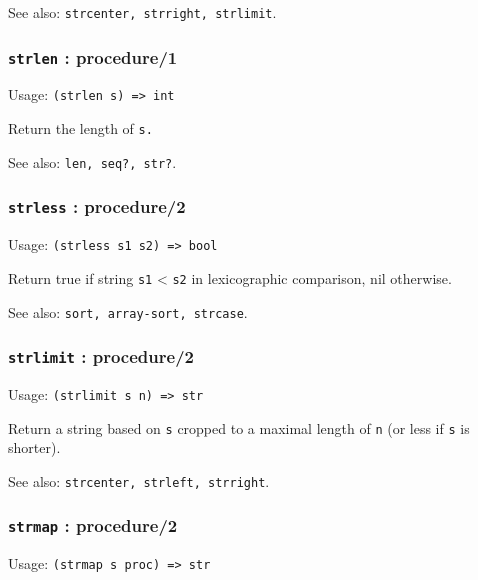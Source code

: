 \documentclass[
]{article}
\newcommand{\passthrough}[1]{#1}
\begin{document}
See also: \passthrough{\lstinline!strcenter, strright, strlimit!}.

\hypertarget{strlen-procedure1}{%
\subsubsection{\texorpdfstring{\texttt{strlen} :
procedure/1}{strlen : procedure/1}}\label{strlen-procedure1}}

Usage: \passthrough{\lstinline!(strlen s) => int!}

Return the length of \passthrough{\lstinline!s.!}

See also: \passthrough{\lstinline!len, seq?, str?!}.

\hypertarget{strless-procedure2}{%
\subsubsection{\texorpdfstring{\texttt{strless} :
procedure/2}{strless : procedure/2}}\label{strless-procedure2}}

Usage: \passthrough{\lstinline!(strless s1 s2) => bool!}

Return true if string \passthrough{\lstinline!s1!} \textless{}
\passthrough{\lstinline!s2!} in lexicographic comparison, nil otherwise.

See also: \passthrough{\lstinline!sort, array-sort, strcase!}.

\hypertarget{strlimit-procedure2}{%
\subsubsection{\texorpdfstring{\texttt{strlimit} :
procedure/2}{strlimit : procedure/2}}\label{strlimit-procedure2}}

Usage: \passthrough{\lstinline!(strlimit s n) => str!}

Return a string based on \passthrough{\lstinline!s!} cropped to a
maximal length of \passthrough{\lstinline!n!} (or less if
\passthrough{\lstinline!s!} is shorter).

See also: \passthrough{\lstinline!strcenter, strleft, strright!}.

\hypertarget{strmap-procedure2}{%
\subsubsection{\texorpdfstring{\texttt{strmap} :
procedure/2}{strmap : procedure/2}}\label{strmap-procedure2}}

Usage: \passthrough{\lstinline!(strmap s proc) => str!}
\end{document}
